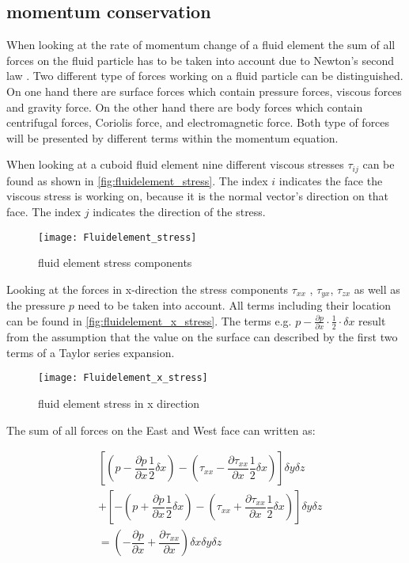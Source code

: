 \documentclass[../thesis.tex]{subfiles}
\begin{document}
\subsection{momentum conservation}
\label{sec:moment_conv}

When looking at the rate of momentum change of a fluid element the sum of all forces on the fluid particle has to be taken into account due to Newton's second law \cite{versteeg2007introduction}. Two different type of forces working on a fluid particle can be distinguished. On one hand there are surface forces which contain pressure forces, viscous forces and gravity force. On the other hand there are body forces which contain centrifugal forces, Coriolis force, and electromagnetic force. Both type of forces will be presented by different terms within the momentum equation.

When looking at a cuboid fluid element nine different viscous stresses $ \tau_{ij} $ can be found as shown in \autoref{fig:fluidelement_stress}. The index $ i $ indicates the face the viscous stress is working on, because it is the normal vector's direction on that face. The index $ j $ indicates the direction of the stress. 

\begin{figure}[htbp]
	\centering
	\texttt{[image: Fluidelement\_stress]}
	\caption{fluid element stress components}
	\label{fig:fluidelement_stress}
\end{figure}

Looking at the forces in x-direction the stress components $ \tau_{xx}$ , $ \tau_{yx}$, $ \tau_{zx}$ as well as the pressure $ p $ need to be taken into account. All terms including their location can be found in \autoref{fig:fluidelement_x_stress}. The terms e.g. $p - \frac{\partial p}{\partial x} \cdot \frac{1}{2} \cdot \delta x$ result from the assumption that the value on the surface can described by the first two terms of a Taylor series expansion.

\begin{figure}[htbp]
	\centering
	\texttt{[image: Fluidelement\_x\_stress]}
	\caption{fluid element stress in x direction}
	\label{fig:fluidelement_x_stress}
\end{figure}

The sum of all forces on the East and West face can written as:

\begin{equation}
	\begin{split}
		& \left[ 
		\left( p - \dfrac{\partial p}{\partial x} \dfrac{1}{2} \delta x \right) - 
		\left( \tau_{xx} - \dfrac{\partial \tau_{xx}}{\partial x} \dfrac{1}{2} \delta x \right)
		\right] \delta y \delta z \\ & + 
		\left[ - 
		\left( p + \dfrac{\partial p}{\partial x} \dfrac{1}{2} \delta x \right) - 
		\left( \tau_{xx} + \dfrac{\partial \tau_{xx}}{\partial x} \dfrac{1}{2} \delta x \right)
		\right] \delta y \delta z \\ & =
		\left( - \dfrac{\partial p}{\partial x} + \dfrac{\partial \tau_{xx}}{\partial x} \right) \delta x \delta y \delta z
	\end{split}
\end{equation}
\end{document}
